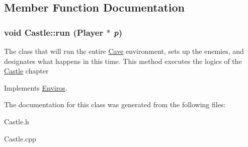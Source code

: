 \subsection{Member Function Documentation}
\hypertarget{classCastle_a4a961593bd68b77a7839d31da9d8dcd6}{
\subsubsection[{run}]{\setlength{\rightskip}{0pt plus 5cm}void Castle::run ({\bf Player} $\ast$ {\em p})}}
\label{classCastle_a4a961593bd68b77a7839d31da9d8dcd6}


The class that will run the entire \hyperlink{classCave}{Cave} environment, sets up the enemies, and designates what happens in this time. This method executes the logics of the \hyperlink{classCastle}{Castle} chapter 

Implements \hyperlink{classEnviros}{Enviros}.

The documentation for this class was generated from the following files:\begin{DoxyCompactItemize}
\item 
Castle.h\item 
Castle.cpp\end{DoxyCompactItemize}
